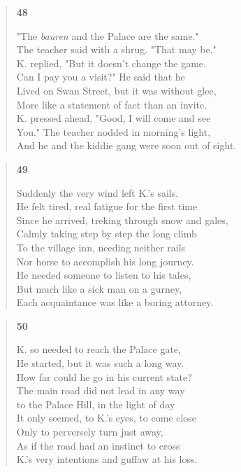 \documentclass{article}
\begin{document}
\newpage
\begin{verse}
  \begin{center}
    \textbf{48} \\
  \end{center}
  "The \textit{bauren} and the Palace are the same." \\
  The teacher said with a shrug. "That may be," \\
  K. replied, "But it doesn't change the game. \\
  Can I pay you a visit?" He said that he \\
  Lived on Swan Street, but it was without glee, \\
  More like a statement of fact than an invite. \\
  K. pressed ahead, "Good, I will come and see \\
  You." The teacher nodded in morning's light, \\
  And he and the kiddie gang were soon out of sight.
\end{verse}
\begin{verse}
  \begin{center}
    \textbf{49} \\
  \end{center}
  Suddenly the very wind left K.'s sails. \\
  He felt tired, real fatigue for the first time \\
  Since he arrived, treking through snow and gales, \\
  Calmly taking step by step the long climb \\
  To the village inn, needing neither rails \\
  Nor horse to accomplish his long journey. \\
  He needed someone to listen to his tales, \\
  But much like a sick man on a gurney, \\
  Each acquaintance was like a boring attorney.
\end{verse}
\begin{verse}
  \begin{center}
    \textbf{50} \\
  \end{center}
  K. so needed to reach the Palace gate, \\
  He started, but it was such a long way. \\
  How far could he go in his current state? \\
  The main road did not lead in any way \\
  to the Palace Hill, in the light of day \\
  It only seemed, to K.'s eyes, to come close \\
  Only to perversely turn just away, \\
  As if the road had an instinct to cross \\
  K.'s very intentions and guffaw at his loss.
\end{verse}
\end{document}
